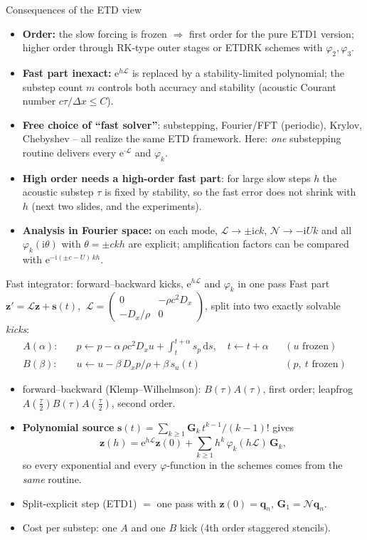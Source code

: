 \documentclass[aspectratio=169,10pt]{beamer}
\newcommand{\dd}{\mathrm{d}}
\newcommand{\ii}{\mathrm{i}}
\newcommand{\ee}{\mathrm{e}}
\newcommand{\bq}{\mathbf{q}}
\newcommand{\LL}{\mathcal{L}}   %
\newcommand{\NN}{\mathcal{N}}   %
\newcommand{\ph}{\varphi}
\begin{document}
\begin{frame}{Consequences of the ETD view}
  \begin{itemize}
    \item \textbf{Order:} the slow forcing is frozen $\Rightarrow$ first order for the pure ETD1 version; higher order
    through RK-type outer stages or ETDRK schemes with $\ph_2,\ph_3$.
    \item \textbf{Fast part inexact:} $\ee^{h\LL}$ is replaced by a stability-limited polynomial; the substep count $m$
    controls both accuracy and stability (acoustic Courant number $c\tau/\Delta x\le C$).
    \item \textbf{Free choice of ``fast solver''}: substepping, Fourier/FFT (periodic), Krylov, Chebyshev --
    all realize the same ETD framework. Here: \emph{one} substepping routine delivers every $\ee^{\cdot\LL}$ and $\ph_k$.
    \item \textbf{High order needs a high-order fast part}: for large slow steps $h$ the acoustic substep $\tau$ is fixed by
    stability, so the fast error does not shrink with $h$ (next two slides, and the experiments).
    \item \textbf{Analysis in Fourier space:} on each mode, $\LL\to\pm\ii ck$, $\NN\to-\ii Uk$ and
    all $\ph_k(\ii\theta)$ with $\theta=\pm ckh$ are explicit; amplification factors can be compared with
    $\ee^{-\ii (\pm c-U)\,kh}$.
  \end{itemize}
\end{frame}

\begin{frame}{Fast integrator: forward--backward kicks, $\ee^{h\LL}$ and $\ph_k$ in one pass}
  Fast part $\mathbf z'=\LL\mathbf z+\mathbf s(t)$, $\ \LL=\begin{pmatrix}0&-\rho c^2D_x\\-D_x/\rho&0\end{pmatrix}$, split into two exactly solvable \emph{kicks}:
  \begin{align*}
    A(\alpha):&\quad p\leftarrow p-\alpha\,\rho c^2D_xu+\textstyle\int_t^{t+\alpha}s_p\,\dd s,\quad t\leftarrow t+\alpha && (u\text{ frozen})\\
    B(\beta):&\quad u\leftarrow u-\beta\,D_xp/\rho+\beta\,s_u(t) && (p,\ t\text{ frozen})
  \end{align*}
  \begin{itemize}
    \item forward--backward (Klemp--Wilhelmson): $B(\tau)A(\tau)$, first order; leapfrog $A(\tfrac\tau2)B(\tau)A(\tfrac\tau2)$, second order.
    \item \textbf{Polynomial source} $\mathbf s(t)=\sum_{k\ge1}\mathbf G_k\,t^{k-1}/(k-1)!$ gives
    \[
       \mathbf z(h)=\ee^{h\LL}\mathbf z(0)+\sum_{k\ge1}h^k\,\ph_k(h\LL)\,\mathbf G_k ,
    \]
    so every exponential and every $\ph$-function in the schemes comes from the \emph{same} routine.
    \item Split-explicit step (ETD1) $=$ one pass with $\mathbf z(0)=\bq_n$, $\mathbf G_1=\NN\bq_n$.
    \item Cost per substep: one $A$ and one $B$ kick (4th order staggered stencils).
  \end{itemize}
\end{frame}
\end{document}
